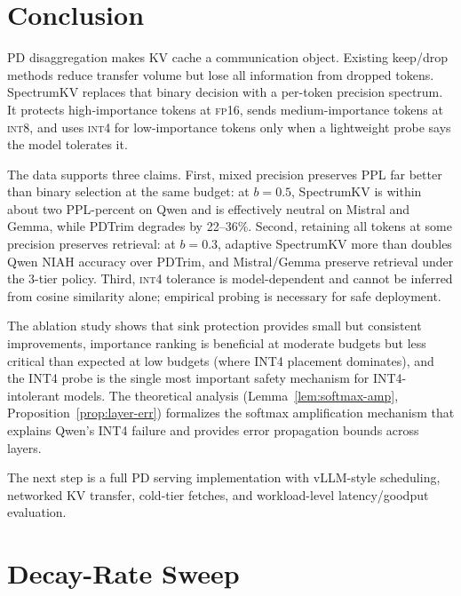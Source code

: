\documentclass[11pt]{article}
\newcommand{\method}{SpectrumKV}
\newcommand{\niah}{NIAH}
\newcommand{\budget}{b}
\newcommand{\pct}{\%}
\newcommand{\fp}{\textsc{fp16}}
\newcommand{\intviii}{\textsc{int8}}
\newcommand{\intiv}{\textsc{int4}}
\theoremstyle{plain}
\theoremstyle{definition}
\begin{document}
\section{Conclusion}
\label{sec:conclusion}

PD disaggregation makes KV cache a communication object.  Existing keep/drop methods reduce transfer volume but lose all information from dropped tokens.  \method{} replaces that binary decision with a per-token precision spectrum.  It protects high-importance tokens at \fp{}, sends medium-importance tokens at \intviii{}, and uses \intiv{} for low-importance tokens only when a lightweight probe says the model tolerates it.

The data supports three claims.  First, mixed precision preserves PPL far better than binary selection at the same budget: at $\budget=0.5$, \method{} is within about two PPL-percent on Qwen and is effectively neutral on Mistral and Gemma, while PDTrim degrades by 22--36\pct{}.  Second, retaining all tokens at some precision preserves retrieval: at $\budget=0.3$, adaptive \method{} more than doubles Qwen \niah{} accuracy over PDTrim, and Mistral/Gemma preserve retrieval under the 3-tier policy.  Third, \intiv{} tolerance is model-dependent and cannot be inferred from cosine similarity alone; empirical probing is necessary for safe deployment.

The ablation study shows that sink protection provides small but consistent improvements, importance ranking is beneficial at moderate budgets but less critical than expected at low budgets (where INT4 placement dominates), and the INT4 probe is the single most important safety mechanism for INT4-intolerant models.  The theoretical analysis (Lemma~\ref{lem:softmax-amp}, Proposition~\ref{prop:layer-err}) formalizes the softmax amplification mechanism that explains Qwen's INT4 failure and provides error propagation bounds across layers.

The next step is a full PD serving implementation with vLLM-style scheduling, networked KV transfer, cold-tier fetches, and workload-level latency/goodput evaluation.

\appendix

\section{Decay-Rate Sweep}
\label{app:decay}
\end{document}
